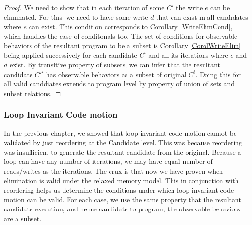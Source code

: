         \begin{proof}
            
            We need to show that in each iteration of some $C^i$ the write $e$ can be eliminated. 
            For this, we need to have some write $d$ that can exist in all candidates where $e$ can exist. 
            This condition corresponds to Corollary \ref{WriteElimCond}, which handles the case of conditonals too. 
            The set of conditions for observable behaviors of the resultant program to be a subset is Corollary \ref{CorolWriteElim} being applied successively for each candidate $C^i$ and all its iterations where $e$ and $d$ exist. 
            By transitive property of subsets, we can infer that the resultant candidate $C'^i$ has observable behaviors as a subset of original $C^i$. 
            Doing this for all valid canddiates extends to program level by property of union of sets and subset relations\footnotemark.
    
                
        \end{proof}
         

        \subsubsection{Loop Invariant Code motion}  

            In the previous chapter, we showed that loop invariant code motion cannot be validated by just reordering at the Candidate level. 
            This was because reordering was insufficient to generate the resultant candidate from the original. 
            Because a loop can have any number of iterations, we may have equal number of reads/writes as the iterations. 
            The crux is that now we have proven when elimination is valid under the relaxed memory model. 
            This in conjunction with reordering helps us determine the conditions under which loop invariant code motion can be valid.
            For each case, we use the same property that the resultant candidate execution, and hence candidate to program, the observable behaviors are a subset. 

